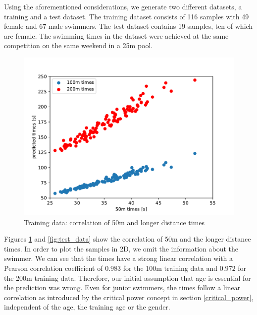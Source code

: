 Using the aforementioned considerations, we generate two different datasets, a training and a test dataset. The training dataset consists of 116 samples with 49 female and 67 male swimmers. The test dataset contains 19 samples, ten of which are female. The swimming times in the dataset were achieved at the same competition on the same weekend in a 25m pool.
\begin{figure}[ht]
    \centering
    \includegraphics[scale=0.5]{visualisation/training_data.pdf}
    \caption{Training data: correlation of 50m and longer distance times}
    \label{fig:training_data}
\end{figure}
Figures \ref{fig:training_data} and \ref{fig:test_data} show the correlation of 50m and the longer distance times. In order to plot the samples in 2D, we omit the information about the swimmer. We can see that the times have a strong linear correlation with a Pearson correlation coefficient of $0.983$ for the 100m training data and $0.972$ for the 200m training data. Therefore, our initial assumption that age is essential for the prediction was wrong. Even for junior swimmers, the times follow a linear correlation as introduced by the critical power concept in section \ref{critical_power}, independent of the age, the training age or the gender.\\
